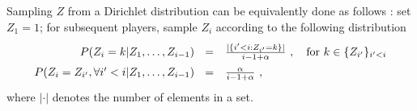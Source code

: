 Sampling $Z$ from a Dirichlet distribution can be equivalently done as follows \cite{neal2000markov}: 
set $Z_1 = 1$; for subsequent players, sample $Z_i$ according to  the following distribution 
\begin{equation*}
\label{eq:condition}
\renewcommand*{\arraystretch}{1.5}
\begin{array}{rl}
    P(Z_i = k | Z_1, \ldots, Z_{i-1}) 
~~=& \frac{|\{i' < i : Z_{i'} = k\}|}{i-1 + \alpha}  ~, \quad \text{for } k \in \{Z_{i'}\}_{i' < i}  \\
   P(Z_i = Z_{i'}, \forall i' < i | Z_1, \ldots, Z_{i-1}) 
~~=& \frac{\alpha}{i-1 + \alpha} ~,
\end{array}
\end{equation*}
where $|\cdot|$ denotes the number of elements in a set.

